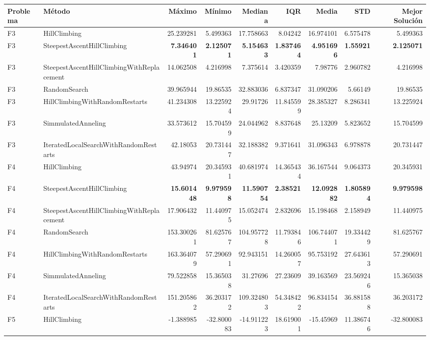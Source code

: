 \begin{tabular}{llrrrrrrr}
\toprule
Problema & Método & Máximo & Mínimo & Mediana & IQR & Media & STD & Mejor Solución \\ 
\midrule
F3 & HillClimbing & 25.239281 & 5.499363 & 17.758663 & 8.04242 & 16.974101 & 6.575478 & 5.499363 \\ 
F3 & SteepestAscentHillClimbing & \textbf{7.346401} & \textbf{2.125071} & \textbf{5.154633} & \textbf{1.837464} & \textbf{4.951696} & \textbf{1.55921} & \textbf{2.125071} \\ 
F3 & SteepestAscentHillClimbingWithReplacement & 14.062508 & 4.216998 & 7.375614 & 3.420359 & 7.98776 & 2.960782 & 4.216998 \\ 
F3 & RandomSearch & 39.965944 & 19.86535 & 32.883036 & 6.837347 & 31.090206 & 5.66149 & 19.86535 \\ 
F3 & HillClimbingWithRandomRestarts & 41.234308 & 13.225924 & 29.91726 & 11.845599 & 28.385327 & 8.286341 & 13.225924 \\ 
F3 & SimmulatedAnneling & 33.573612 & 15.704599 & 24.044962 & 8.837648 & 25.13209 & 5.823652 & 15.704599 \\ 
F3 & IteratedLocalSearchWithRandomRestarts & 42.18053 & 20.731447 & 32.188382 & 9.371641 & 31.096343 & 6.978878 & 20.731447 \\ 
F4 & HillClimbing & 43.94974 & 20.345931 & 40.681974 & 14.365434 & 36.167544 & 9.064373 & 20.345931 \\ 
F4 & SteepestAscentHillClimbing & \textbf{15.601448} & \textbf{9.979598} & \textbf{11.590754} & \textbf{2.38521} & \textbf{12.092882} & \textbf{1.805894} & \textbf{9.979598} \\ 
F4 & SteepestAscentHillClimbingWithReplacement & 17.906432 & 11.440975 & 15.052474 & 2.832696 & 15.198468 & 2.158949 & 11.440975 \\ 
F4 & RandomSearch & 153.300261 & 81.625767 & 104.957728 & 11.793846 & 106.744071 & 19.334429 & 81.625767 \\ 
F4 & HillClimbingWithRandomRestarts & 163.364079 & 57.290691 & 92.943151 & 14.260057 & 95.753192 & 27.643613 & 57.290691 \\ 
F4 & SimmulatedAnneling & 79.522858 & 15.365038 & 31.27696 & 27.23609 & 39.163569 & 23.569246 & 15.365038 \\ 
F4 & IteratedLocalSearchWithRandomRestarts & 151.205862 & 36.203172 & 109.324803 & 54.348422 & 96.834154 & 36.881588 & 36.203172 \\ 
F5 & HillClimbing & -1.388985 & -32.800083 & -14.911223 & 18.619001 & -15.45969 & 11.386746 & -32.800083 \\ 

\end{tabular}
